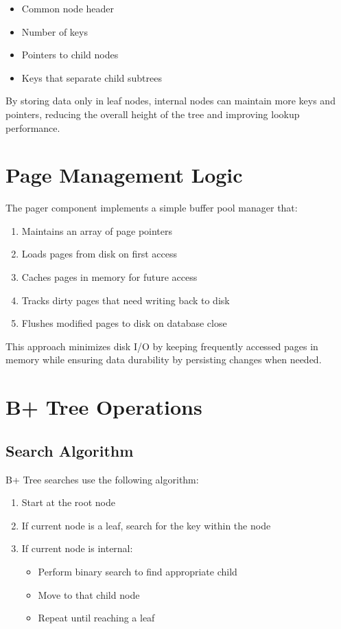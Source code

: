 \documentclass[12pt,a4paper]{article}  %
\begin{document}
\begin{itemize}
    \item Common node header
    \item Number of keys
    \item Pointers to child nodes
    \item Keys that separate child subtrees
\end{itemize}

By storing data only in leaf nodes, internal nodes can maintain more keys and pointers, reducing the overall height of the tree and improving lookup performance.

\section{Page Management Logic}

The pager component implements a simple buffer pool manager that:

\begin{enumerate}
    \item Maintains an array of page pointers
    \item Loads pages from disk on first access
    \item Caches pages in memory for future access
    \item Tracks dirty pages that need writing back to disk
    \item Flushes modified pages to disk on database close
\end{enumerate}

This approach minimizes disk I/O by keeping frequently accessed pages in memory while ensuring data durability by persisting changes when needed.

\section{B+ Tree Operations}

\subsection{Search Algorithm}
B+ Tree searches use the following algorithm:

\begin{enumerate}
    \item Start at the root node
    \item If current node is a leaf, search for the key within the node
    \item If current node is internal:
        \begin{itemize}
            \item Perform binary search to find appropriate child
            \item Move to that child node
            \item Repeat until reaching a leaf
        \end{itemize}
\end{enumerate}
\end{document}
